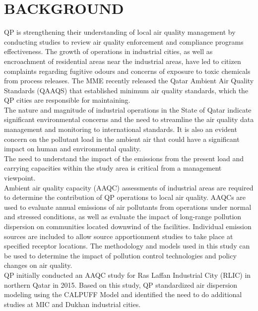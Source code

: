 \chapter{BACKGROUND}

QP is strengthening their understanding of local air quality management by conducting studies to review air quality enforcement and compliance programs effectiveness. The growth of operations in industrial cities, as well as encroachment of residential areas near the industrial areas, have led to citizen complaints regarding fugitive odours and concerns of exposure to toxic chemicals from process releases.  The MME recently released the Qatar Ambient Air Quality Standards (QAAQS) that established minimum air quality standards, which the QP cities are responsible for maintaining.\\

The nature and magnitude of industrial operations in the State of Qatar indicate significant environmental concerns and the need to streamline the air quality data management and monitoring to international standards.  It is also an evident concern on the pollutant load in the ambient air that could have a significant impact on human and environmental quality. \\

The need to understand the impact of the emissions from the present load and carrying capacities within the study area is critical from a management viewpoint.\\

Ambient air quality capacity (AAQC) assessments of industrial areas are required to determine the contribution of QP operations to local air quality. AAQCs are used to evaluate annual emissions of air pollutants from operations under normal and stressed conditions, as well as evaluate the impact of long-range pollution dispersion on communities located downwind of the facilities. Individual emission sources are included to allow source apportionment studies to take place at specified receptor locations. The methodology and models used in this study can be used to determine the impact of pollution control technologies and policy changes on air quality.\\

QP initially conducted an AAQC study for Ras Laffan Industrial City (RLIC) in northern Qatar in 2015. Based on this study, QP standardized air dispersion modeling using the CALPUFF Model and identified the need to do additional studies at MIC and Dukhan industrial cities.

